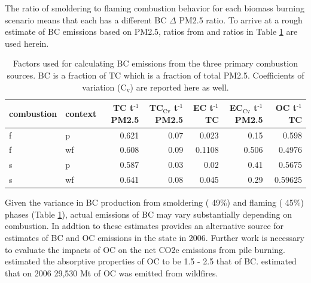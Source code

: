 \documentclass[a4paper]{article}
\begin{document}
The ratio of smoldering to flaming combustion behavior for each biomass burning scenario means that each has a different \ac{BC} $\Delta$ \ac{PM2.5}
ratio. To arrive at a rough estimate of \ac{BC} emissions based on PM2.5, ratios from  \citet{Ward1989} and \citet{Jenk1996} ratios in Table \ref{tab:bc_pm} are used herein.
\begin{table}[htb]
\caption{Factors used for calculating \ac{BC} emissions from the three primary combustion sources. \ac{BC} is a fraction of \ac{TC} which is a fraction of total \ac{PM2.5}. Coefficients of variation (C$_{\text{v}}$) are reported here as well. \label{tab:bc_pm}}
\centering
\begin{tabular}{llrrrrr}
combustion & context & TC t$^{\text{-1}}$ \ac{PM2.5} & TC$_{\text{Cv}}$ t$^{\text{-1}}$ \ac{PM2.5} & EC t$^{\text{-1}}$ TC & EC$_{\text{Cv}}$ t$^{\text{-1}}$ \ac{PM2.5} & OC t$^{\text{-1}}$ TC\\
\hline
f & p & 0.621 & 0.07 & 0.023 & 0.15 & 0.598\\
f & wf & 0.608 & 0.09 & 0.1108 & 0.506 & 0.4976\\
s & p & 0.587 & 0.03 & 0.02 & 0.41 & 0.5675\\
s & wf & 0.641 & 0.08 & 0.045 & 0.29 & 0.59625\\
\end{tabular}
\end{table}

Given the variance in \ac{BC} production from smoldering (\textpm{} 49\%) and flaming (\textpm{} 45\%) phases (Table \ref{tab:bc_pm}), actual emissions of \ac{BC}  may vary substantially depending on combustion. In addtion to these estimates \cite{Chow2010} provides an alternative source for estimates of \ac{BC} and \ac{OC} emissions in the state in 2006. Further work is necessary to evaluate the impacts of \ac{OC} on the net \ac{CO2e} emissions from pile burning. \cite{Pokhrel2016} estimated the absorptive properties of \ac{OC} to be 1.5 - 2.5 that of \ac{BC}. \cite{Chow2010} estimated that on 2006 29,530 Mt of \ac{OC} was emitted from wildfires. 
\end{document}
